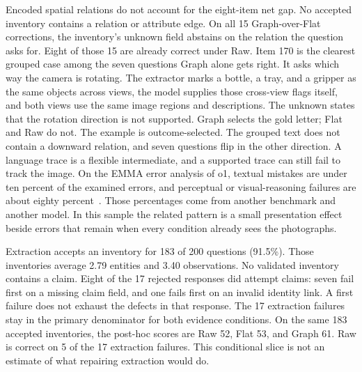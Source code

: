 

Encoded spatial relations do not account for the eight-item net gap. No accepted inventory contains a relation or attribute edge. On all 15 Graph-over-Flat corrections, the inventory's unknown field abstains on the relation the question asks for. Eight of those 15 are already correct under Raw. Item 170 is the clearest grouped case among the seven questions Graph alone gets right. It asks which way the camera is rotating. The extractor marks a bottle, a tray, and a gripper as the same objects across views, the model supplies those cross-view flags itself, and both views use the same image regions and descriptions. The unknown states that the rotation direction is not supported. Graph selects the gold letter; Flat and Raw do not. The example is outcome-selected. The grouped text does not contain a downward relation, and seven questions flip in the other direction. A language trace is a flexible intermediate, and a supported trace can still fail to track the image. On the EMMA error analysis of o1, textual mistakes are under ten percent of the examined errors, and perceptual or visual-reasoning failures are about eighty percent~\citep{hao2025emma}. Those percentages come from another benchmark and another model. In this sample the related pattern is a small presentation effect beside errors that remain when every condition already sees the photographs.

Extraction accepts an inventory for 183 of 200 questions (91.5\%). Those inventories average 2.79 entities and 3.40 observations. No validated inventory contains a claim. Eight of the 17 rejected responses did attempt claims: seven fail first on a missing claim field, and one fails first on an invalid identity link. A first failure does not exhaust the defects in that response. The 17 extraction failures stay in the primary denominator for both evidence conditions. On the same 183 accepted inventories, the post-hoc scores are Raw 52, Flat 53, and Graph 61. Raw is correct on 5 of the 17 extraction failures. This conditional slice is not an estimate of what repairing extraction would do.

